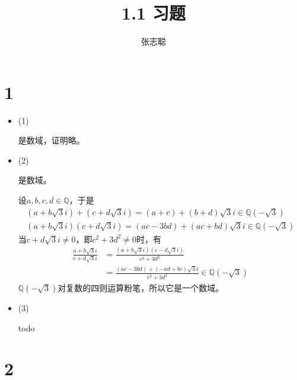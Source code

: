 \documentclass{article}
\begin{document}
\title{1.1 习题}
\author{张志聪}
\maketitle

\section*{1}

\begin{itemize}
      \item (1)

            是数域，证明略。
      \item (2)

            是数域。

            设$a, b, c, d \in \mathbb{Q}$，于是
            \begin{align*}
                  (a + b\sqrt{3}i) + (c + d\sqrt{3}i) = (a + c) + (b + d)\sqrt{3}i \in \mathbb{Q}(-\sqrt{3}) \\
                  (a + b\sqrt{3}i) (c + d\sqrt{3}i) = (ac - 3bd) + (ac + bd)\sqrt{3}i \in \mathbb{Q}(-\sqrt{3})
            \end{align*}
            当$c + d\sqrt{3}i \neq 0$，即$c^2 + 3d^2 \neq 0$时，有
            \begin{align*}
                  \frac{a + b\sqrt{3}i}{c + d\sqrt{3}i}
                   & = \frac{(a + b\sqrt{3}i)(c - d\sqrt{3}i)}{c^2 + 3d^2}                           \\
                   & = \frac{(ac - 3bd) + (-ad + bc)\sqrt{3}i}{c^2 + 3d^2} \in \mathbb{Q}(-\sqrt{3})
            \end{align*}
            $\mathbb{Q}(-\sqrt{3})$对复数的四则运算粉笔，所以它是一个数域。

      \item (3)

            todo



\end{itemize}

\section*{2}
\end{document}
